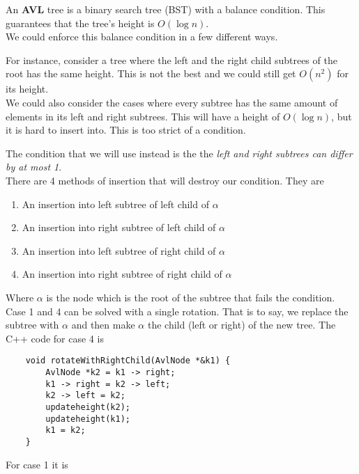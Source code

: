 \documentclass[]{article}
\begin{document}
An \textbf{AVL} tree is a binary search tree (BST) with a balance condition. This guarantees that the tree's height is $O(\log n)$.\\

We could enforce this balance condition in a few different ways. 

For instance, consider a tree where the left and the right child subtrees of the root has the same height. This is not the best and we could still get $O(n^2)$ for its height.\\ 

We could also consider the cases where every subtree has the same amount of elements in its left and right subtrees. This will have a height of $O(\log n)$, but it is hard to insert into. This is too strict of a condition.

The condition that we will use instead is the the \textit{left and right subtrees can differ by at most 1}.\\



There are 4 methods of insertion that will destroy our condition. They are

\begin{enumerate}
	\item An insertion into left subtree of left child of $\alpha$
	\item An insertion into right subtree of left child of $\alpha$
	\item An insertion into left subtree of right child of $\alpha$
	\item An insertion into right subtree of right child of $\alpha$
\end{enumerate}\bigbreak

Where $\alpha$ is the node which is the root of the subtree that fails the condition.\\

Case 1 and 4 can be solved with a single rotation. That is to say, we replace the subtree with $\alpha$ and then make $\alpha$ the child (left or right) of the new tree. The C++ code for case 4 is\\

\begin{lstlisting}
	void rotateWithRightChild(AvlNode *&k1) {
		AvlNode *k2 = k1 -> right;
		k1 -> right = k2 -> left;
		k2 -> left = k2;
		updateheight(k2);
		updateheight(k1);
		k1 = k2;
	}
\end{lstlisting}\bigbreak

For case 1 it is
\end{document}
